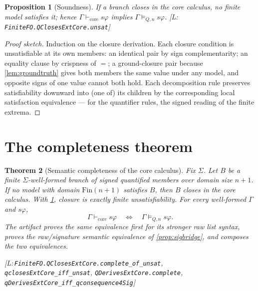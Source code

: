 \documentclass[11pt,a4paper]{article}
\newtheorem{theorem}{Theorem}[section]
\newtheorem{proposition}[theorem]{Proposition}
\theoremstyle{definition}
\newcommand{\lean}[1]{\texttt{#1}}
\newenvironment{leanrefs}
  {\par\smallskip\noindent\begin{minipage}{\linewidth}\small\raggedright}
  {\end{minipage}\par\smallskip}
\newcommand{\qder}{\vdash_{\mathrm{core}}}
\newcommand{\qmod}{\models_{Q,n}}
\begin{document}
\begin{proposition}[Soundness]\label{prop:soundness}
If a branch closes in the core calculus, no finite model satisfies it;
hence $\Gamma\qder s\varphi$ implies $\Gamma\qmod s\varphi$.
[L:\,\lean{FiniteFO.QClosesExtCore.unsat}]
\end{proposition}

\begin{proof}[Proof sketch]
Induction on the closure derivation. Each closure condition is
unsatisfiable at its own members: an identical pair by sign
complementarity; an equality clause by crispness of $=$; a ground-closure
pair because \cref{lem:groundtruth} gives both members the same value
under any model, and opposite signs of one value cannot both hold. Each
decomposition rule preserves satisfiability downward into (one of) its
children by the corresponding local satisfaction equivalence — for the
quantifier rules, the signed reading of the finite extrema.
\end{proof}

\section{The completeness theorem}\label{sec:completeness}

\begin{theorem}[Semantic completeness of the core calculus]\label{thm:complete}
Fix $\Sigma$. Let $B$ be a finite $\Sigma$-well-formed branch of signed
quantified members over domain size $n{+}1$. If no model with domain
$\mathrm{Fin}(n{+}1)$ satisfies $B$, then $B$ closes in the core
calculus. With \cref{prop:soundness}, closure is \emph{exactly} finite
unsatisfiability. For every well-formed $\Gamma$ and $s\varphi$,
\[
\Gamma \qder s\varphi \quad\Longleftrightarrow\quad \Gamma \qmod s\varphi .
\]
The artifact proves the same equivalence first for its stronger raw
list syntax, proves the raw/signature semantic equivalence of
\cref{prop:sigbridge}, and composes the two equivalences.
\begin{leanrefs}
[L:\,\lean{FiniteFO.QClosesExtCore.complete\_of\_unsat},\\
\quad\lean{qclosesExtCore\_iff\_unsat},
\lean{QDerivesExtCore.complete},\\
\quad\lean{qDerivesExtCore\_iff\_qconsequence4Sig}]
\end{leanrefs}
\end{theorem}
\end{document}
